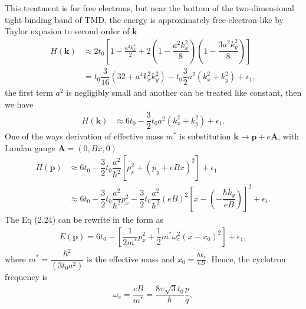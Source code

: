 \documentclass{report}
\newcommand{\f}[2]{\dfrac{#1}{#2}}
\begin{document}
This treatment is for free electrons, \cite{10.1119/1.1615568} but near the bottom of the two-dimensional tight-binding band of TMD, the energy is approximately free-electron-like by Taylor expasion to second order of $\mathbf{k}$
\begin{equation}
	\begin{aligned}
		H(\mathbf{k})
		 & \approx 2 t_{0} \left[1 - \frac{a^{2} k_{x}^{2}}{2} + 2\left(1 - \f{a^{2} k_{x}^{2}}{8}\right)\left(1 - \f{3a^{2} k_{y}^{2}}{8}\right)\right] \\
		 & = t_{0} \f{3}{16} \left(32 + a^{4} k_{x}^{2} k_{y}^{2}\right) - t_{0} \f{3}{2} a^{2}\left(k_{x}^{2} + k_{y}^{2}\right) + \epsilon_{1} ,
	\end{aligned}
\end{equation}
the first term $a^{2}$ is negligibly small and another can be treated like constant, then we have
\begin{equation}
	\begin{aligned}
		H(\mathbf{k})
		 & \approx 6 t_{0} - \f{3}{2} t_{0} a^{2} (k_{x}^{2} + k_{y}^{2}) + \epsilon_{1}.
	\end{aligned}
\end{equation}
One of the ways derivation of effective mass $m^{*}$ is substitution $\mathbf{k} \rightarrow \mathbf{p} + e \mathbf{A}$, with Landau gauge $\mathbf{A} = (0,Bx,0)$
\begin{equation}
	\begin{aligned}
		H(\mathbf{p})
		 & \approx 6 t_{0} - \f{3}{2} t_{0} \f{a^{2}}{\hbar^{2}} \left[ p_{x}^{2} + \left(p_{y} + e B x\right)^{2}\right] + \epsilon_{1}                                                             \\
		 & \approx 6 t_{0} - \f{3}{2} t_{0} \f{a^{2}}{\hbar^{2}} p_{x}^{2} - \f{3}{2} t_{0} \f{a^{2}}{\hbar^{2}} (e B)^{2} \left[ x - \left(- \f{\hbar k_{y}}{eB}\right) \right]^{2} + \epsilon_{1}.
	\end{aligned}
\end{equation}
The Eq (2.24) can be rewrite in the form as
\begin{gather}
	E(\mathbf{p}) = 6 t_{0} - \left[\f{1}{2m^{*}} p_{x}^{2} + \f{1}{2} m^{*} \omega_{c}^{2}(x - x_{0})^{2}\right] + \epsilon_{1},
\end{gather}
where $m^{*} = \f{\hbar^{2}}{(3t_{0}a^{2}) }$ is the effective mass and $x_{0} = \frac{\hbar k_{y}}{eB}$. Hence, the cyclotron frequency is
\begin{gather}
	\omega_{c} = \f{eB}{m^{*}} = \f{8 \pi \sqrt{3} t_{0}}{\hbar}  \f{p}{q},
\end{gather}
\end{document}

